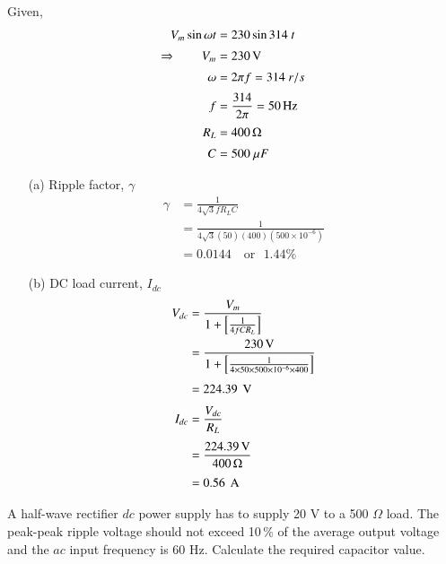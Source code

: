 \begin{solution}
Given, 
\begin{align*}
V_m \sin \omega t & = 230 \sin 314~ t \\[2pt]
\Rightarrow\qquad V_m & = 230 \operatorname{\mathrm{V}}\\[2pt]
\omega & = 2 \pi f = 314~ r/s\\[2pt]
f & = \frac{314}{2\pi} = 50 \operatorname{Hz}\\[2pt]
R_L & = 400\,\Omega\\[2pt]
C & = 500 ~\mu F
\end{align*}
\begin{itemize}
\item[(a)] Ripple factor, $\gamma$
\begin{align*}
\gamma & = \frac{1}{4 \sqrt{3} f R_L C}\\
& = \frac{1}{4 \sqrt{3} (50) (400) (500 \times 10^{-6})}\\[2pt]
& = 0.0144 \text{ ~ or ~} 1.44\%
\end{align*}

\item[(b)] DC load current, $I_{dc}$
\begin{align*}
V_{dc} & = \frac{V_m}{1 + \left[\frac{1}{4 f C R_L} \right]}\\
& = \frac{230\text{\,V}}{1+ \left[ \frac{1}{4 \times 50 \times 500 \times
      10^{-6} \times 400}\right]}\\[3pt]
& = 224.39 ~\operatorname{\mathrm{V}}\\[3pt]
I_{dc} & = \frac{V_{dc}}{R_L}\\[3pt]
& = \frac{224.39\text{\,V}}{400\,\Omega}\\[3pt]
& = 0.56 ~ \operatorname{A}
\end{align*}
\end{itemize}
\vskip -1cm
\end{solution}

\begin{example}\label{exam2.21}
A half-wave rectifier $dc$ power supply has to supply 20 V to a 500
$\Omega$ load. The peak-peak ripple voltage should not exceed 10\,\%
of the average output voltage and the $ac$ input frequency is 60
Hz. Calculate the required capacitor value.
\end{example}

